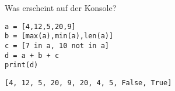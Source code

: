 \question[3]
Was erscheint auf der Konsole?
\begin{lstlisting}
a = [4,12,5,20,9]
b = [max(a),min(a),len(a)]
c = [7 in a, 10 not in a]
d = a + b + c
print(d)
\end{lstlisting}
\begin{solutionbox}{1cm}
\texttt{[4, 12, 5, 20, 9, 20, 4, 5, False, True]}
\end{solutionbox}
